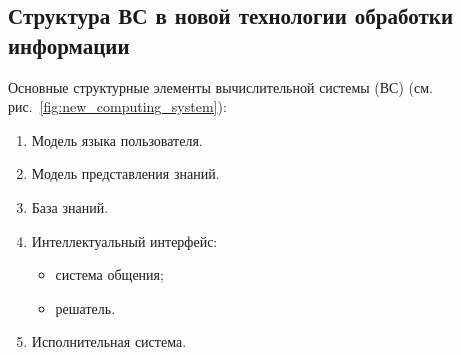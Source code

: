 \subsection{Структура ВС в новой технологии обработки информации}
Основные структурные элементы вычислительной системы (ВС) (см. рис.~\ref{fig:new_computing_system}):
\begin{enumerate}
\item Модель языка пользователя.
\item Модель представления знаний.
\item База знаний.
\item Интеллектуальный интерфейс:
  \begin{itemize}
  \item система общения;
  \item решатель.
  \end{itemize}
\item Исполнительная система.
\end{enumerate}

